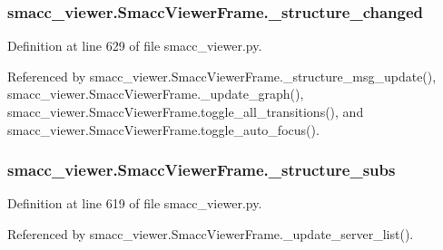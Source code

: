 \subsubsection[{\texorpdfstring{\+\_\+structure\+\_\+changed}{_structure_changed}}]{\setlength{\rightskip}{0pt plus 5cm}smacc\+\_\+viewer.\+Smacc\+Viewer\+Frame.\+\_\+structure\+\_\+changed\hspace{0.3cm}{\ttfamily [private]}}\hypertarget{classsmacc__viewer_1_1SmaccViewerFrame_aa5d9c77b0c46dfb7d5258d1efbcc74b0}{}\label{classsmacc__viewer_1_1SmaccViewerFrame_aa5d9c77b0c46dfb7d5258d1efbcc74b0}


Definition at line 629 of file smacc\+\_\+viewer.\+py.



Referenced by smacc\+\_\+viewer.\+Smacc\+Viewer\+Frame.\+\_\+structure\+\_\+msg\+\_\+update(), smacc\+\_\+viewer.\+Smacc\+Viewer\+Frame.\+\_\+update\+\_\+graph(), smacc\+\_\+viewer.\+Smacc\+Viewer\+Frame.\+toggle\+\_\+all\+\_\+transitions(), and smacc\+\_\+viewer.\+Smacc\+Viewer\+Frame.\+toggle\+\_\+auto\+\_\+focus().

\subsubsection[{\texorpdfstring{\+\_\+structure\+\_\+subs}{_structure_subs}}]{\setlength{\rightskip}{0pt plus 5cm}smacc\+\_\+viewer.\+Smacc\+Viewer\+Frame.\+\_\+structure\+\_\+subs\hspace{0.3cm}{\ttfamily [private]}}\hypertarget{classsmacc__viewer_1_1SmaccViewerFrame_aed30d68f7aa8ba4a422da87216e4ef5a}{}\label{classsmacc__viewer_1_1SmaccViewerFrame_aed30d68f7aa8ba4a422da87216e4ef5a}


Definition at line 619 of file smacc\+\_\+viewer.\+py.



Referenced by smacc\+\_\+viewer.\+Smacc\+Viewer\+Frame.\+\_\+update\+\_\+server\+\_\+list().

